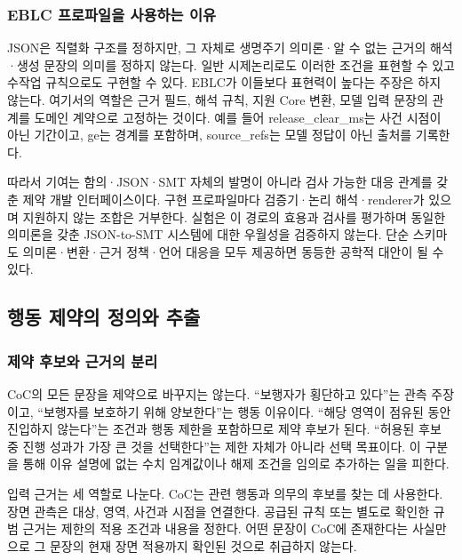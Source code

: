 \documentclass[10pt,a4paper,twocolumn]{article}\usepackage[margin=18mm]{geometry}\usepackage{fontspec,kotex}
\begin{document}
\subsubsection{EBLC 프로파일을 사용하는 이유}

JSON은 직렬화 구조를 정하지만, 그 자체로 생명주기 의미론·알 수 없는 근거의 해석·생성 문장의 의미를 정하지 않는다. 일반 시제논리로도 이러한 조건을 표현할 수 있고 수작업 규칙으로도 구현할 수 있다. EBLC가 이들보다 표현력이 높다는 주장은 하지 않는다. 여기서의 역할은 근거 필드, 해석 규칙, 지원 Core 변환, 모델 입력 문장의 관계를 도메인 계약으로 고정하는 것이다. 예를 들어 {\ttfamily{}\selectfont\footnotesize release\_\allowbreak clear\_\allowbreak ms}는 사건 시점이 아닌 기간이고, {\ttfamily{}\selectfont\footnotesize ge}는 경계를 포함하며, {\ttfamily{}\selectfont\footnotesize source\_\allowbreak refs}는 모델 정답이 아닌 출처를 기록한다.\par

따라서 기여는 함의·JSON·SMT 자체의 발명이 아니라 검사 가능한 대응 관계를 갖춘 제약 개발 인터페이스이다. 구현 프로파일마다 검증기·논리 해석·renderer가 있으며 지원하지 않는 조합은 거부한다. 실험은 이 경로의 효용과 검사를 평가하며 동일한 의미론을 갖춘 JSON-to-SMT 시스템에 대한 우월성을 검증하지 않는다. 단순 스키마도 의미론·변환·근거 정책·언어 대응을 모두 제공하면 동등한 공학적 대안이 될 수 있다.\par

\subsection{행동 제약의 정의와 추출}

\subsubsection{제약 후보와 근거의 분리}

CoC의 모든 문장을 제약으로 바꾸지는 않는다. “보행자가 횡단하고 있다”는 관측 주장이고, “보행자를 보호하기 위해 양보한다”는 행동 이유이다. “해당 영역이 점유된 동안 진입하지 않는다”는 조건과 행동 제한을 포함하므로 제약 후보가 된다. “허용된 후보 중 진행 성과가 가장 큰 것을 선택한다”는 제한 자체가 아니라 선택 목표이다. 이 구분을 통해 이유 설명에 없는 수치 임계값이나 해제 조건을 임의로 추가하는 일을 피한다.\par

입력 근거는 세 역할로 나눈다. CoC는 관련 행동과 의무의 후보를 찾는 데 사용한다. 장면 관측은 대상, 영역, 사건과 시점을 연결한다. 공급된 규칙 또는 별도로 확인한 규범 근거는 제한의 적용 조건과 내용을 정한다. 어떤 문장이 CoC에 존재한다는 사실만으로 그 문장의 현재 장면 적용까지 확인된 것으로 취급하지 않는다.\par
\end{document}
